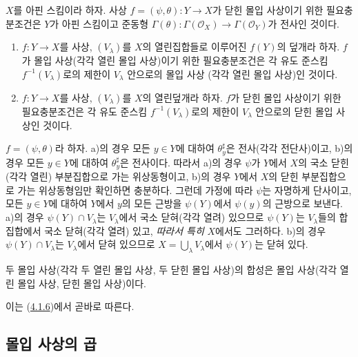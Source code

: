 \begin{corollary}[4.2.3]
\label{I.4.2.3-ko}
$X$를 아핀 스킴이라 하자. 사상 $f=(\psi,\theta):Y\to X$가 닫힌
몰입 사상이기 위한 필요충분조건은 $Y$가 아핀 스킴이고 준동형
$\Gamma(\theta):\Gamma(\mathscr{O}_X)\to\Gamma(\mathscr{O}_Y)$가
전사인 것이다.
\end{corollary}

\begin{corollary}[4.2.4]
\label{I.4.2.4-ko}
\begin{enumerate}
  \item[a)] $f:Y\to X$를 사상, $(V_\lambda)$를 $X$의 열린집합들로
  이루어진 $f(Y)$의 덮개라 하자. $f$가 몰입 사상(각각 열린 몰입
  사상)이기 위한 필요충분조건은
  각 유도 준스킴
  $f^{-1}(V_\lambda)$로의 제한이 $V_\lambda$ 안으로의 몰입 사상
  (각각 열린 몰입 사상)인 것이다.
  \item[b)] $f:Y\to X$를 사상, $(V_\lambda)$를 $X$의 열린덮개라
  하자. $f$가 닫힌 몰입 사상이기 위한 필요충분조건은 각 유도
  준스킴 $f^{-1}(V_\lambda)$로의 제한이 $V_\lambda$ 안으로의 닫힌
  몰입 사상인 것이다.
\end{enumerate}
\end{corollary}

$f=(\psi,\theta)$라 하자. a)의 경우 모든 $y\in Y$에 대하여
$\theta_y^\sharp$은 전사(각각 전단사)이고, b)의 경우 모든 $y\in Y$에
대하여 $\theta_y^\sharp$은 전사이다. 따라서 a)의 경우 $\psi$가
$Y$에서 $X$의 국소 닫힌(각각 열린) 부분집합으로 가는 위상동형이고,
b)의 경우 $Y$에서 $X$의 닫힌 부분집합으로 가는 위상동형임만 확인하면
충분하다. 그런데 가정에 따라 $\psi$는 자명하게 단사이고, 모든
$y\in Y$에 대하여 $Y$에서 $y$의 모든 근방을 $\psi(Y)$에서
$\psi(y)$의 근방으로 보낸다. a)의 경우
$\psi(Y)\cap V_\lambda$는 $V_\lambda$에서 국소 닫혀(각각 열려)
있으므로 $\psi(Y)$는 $V_\lambda$들의 합집합에서 국소 닫혀(각각 열려)
있고, \emph{따라서 특히} $X$에서도 그러하다. b)의 경우
$\psi(Y)\cap V_\lambda$는 $V_\lambda$에서 닫혀 있으므로
$X=\bigcup_\lambda V_\lambda$에서 $\psi(Y)$는 닫혀 있다.

\begin{proposition}[4.2.5]
\label{I.4.2.5-ko}
두 몰입 사상(각각 두 열린 몰입 사상, 두 닫힌 몰입 사상)의 합성은
몰입 사상(각각 열린 몰입 사상, 닫힌 몰입 사상)이다.
\end{proposition}

이는 (\hyperref[I.4.1.6-ko]{4.1.6})에서 곧바로 따른다.

\subsection{몰입 사상의 곱}
\label{subsection:I.4.3-ko}

